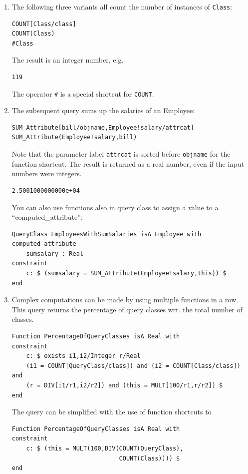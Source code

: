 \begin{enumerate}
\item The following three variants all count the number of instances of {\tt Class}:
\begin{verbatim}
COUNT[Class/class]
COUNT(Class)
#Class
\end{verbatim}

The result is an integer number, e.g.\
\begin{verbatim}
119
\end{verbatim}

The operator {\tt \#} is a special shortcut for {\tt COUNT}. 

\item The subsequent query sums up the salaries of an Employee:
\begin{verbatim}
SUM_Attribute[bill/objname,Employee!salary/attrcat]
SUM_Attribute(Employee!salary,bill)
\end{verbatim}


Note that the parameter label {\tt attrcat} is sorted before {\tt objname} for the function shortcut. 
The result is returned as a real number, even if the input numbers were integers.
{\small
\begin{verbatim}
2.5001000000000e+04
\end{verbatim}
}

You can also use functions also in query class to assign a value to a ``computed\_attribute'':
{\small
\begin{verbatim}
QueryClass EmployeesWithSumSalaries isA Employee with
computed_attribute
    sumsalary : Real
constraint
    c: $ (sumsalary = SUM_Attribute(Employee!salary,this)) $
end
\end{verbatim}
}

\item Complex computations can be made by using multiple functions in a row. This query returns the
percentage of query classes wrt. the total number of classes.
{\small
\begin{verbatim}
Function PercentageOfQueryClasses isA Real with
constraint
    c: $ exists i1,i2/Integer r/Real
    (i1 = COUNT[QueryClass/class]) and (i2 = COUNT[Class/class]) and
    (r = DIV[i1/r1,i2/r2]) and (this = MULT[100/r1,r/r2]) $
end
\end{verbatim}
}

The query can be simplified with the use of function shortcuts to 

{\small
\begin{verbatim}
Function PercentageOfQueryClasses isA Real with
constraint
    c: $ (this = MULT(100,DIV(COUNT(QueryClass),
                              COUNT(Class)))) $
end
\end{verbatim}
}


\end{enumerate}
